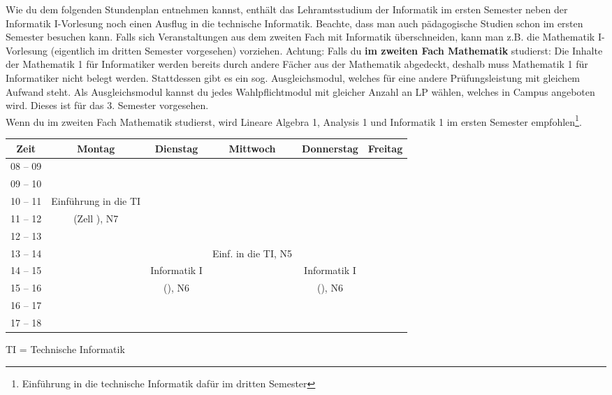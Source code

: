 Wie du dem folgenden Stundenplan entnehmen kannst, enthält das Lehramtsstudium der Informatik im ersten Semester neben der Informatik I-Vorlesung noch einen Ausflug in die technische Informatik. 
Beachte, dass man auch pädagogische Studien schon im ersten Semester besuchen kann. Falls sich Veranstaltungen aus dem zweiten
Fach mit Informatik überschneiden, kann man z.B. die Mathematik I-Vorlesung (eigentlich im dritten Semester vorgesehen) vorziehen. Achtung: Falls du \textbf{im zweiten Fach Mathematik} studierst: Die Inhalte der Mathematik 1 für Informatiker werden bereits durch andere Fächer aus der Mathematik abgedeckt, deshalb muss Mathematik 1 für Informatiker nicht belegt werden. Stattdessen gibt es ein sog. Ausgleichsmodul, welches für eine andere Prüfungsleistung mit gleichem Aufwand steht. Als Ausgleichsmodul kannst du jedes Wahlpflichtmodul mit gleicher Anzahl an LP wählen, welches in Campus angeboten wird. Dieses ist für das 3. Semester vorgesehen. \\
Wenn du im zweiten Fach Mathematik studierst, wird Lineare Algebra 1, Analysis 1 und Informatik 1 im ersten Semester empfohlen\footnote{Einführung in die technische Informatik dafür im dritten Semester}.


\begin{center}
	\begin{tabular}{|c|c|c|c|c|c|} \hline
		Zeit      & 			Montag 		& Dienstag			& Mittwoch 			& Donnerstag 			& Freitag	 \\
		\hline\hline
		08 -- 09  & 					 	&  					&					&  						&			\\
		\hline
		09 -- 10  & 						& 					&					 &  					&			\\
		\hline
		10 -- 11  &	Einführung in die TI	&					&					&						&			\\
		\cline{1-1}\cline{3-6}
		11 -- 12 & 	(Zell	), N7			&  					&					&			 			& 			\\
		\hline
		12 -- 13 & 							& 				 	& 				    & 						& 			 \\
		\hline
		13 -- 14 & 							& 					& Einf. in die TI, N5	& 						& 			 \\
		\hline
		14 -- 15 & 							& Informatik I 		& 					& Informatik I 			& 				\\
		\cline{1-2}\cline{4-4}\cline{6-6}
		15 -- 16 &							 & (\Infoprof), N6 	& 					& (\Infoprof), N6 		& 				\\
		\hline
		16 -- 17 & & & & &\\
		\hline
		17 -- 18 & & & & & \\
		\hline
	\end{tabular}
	
	\scriptsize TI = Technische Informatik
	
\end{center}

